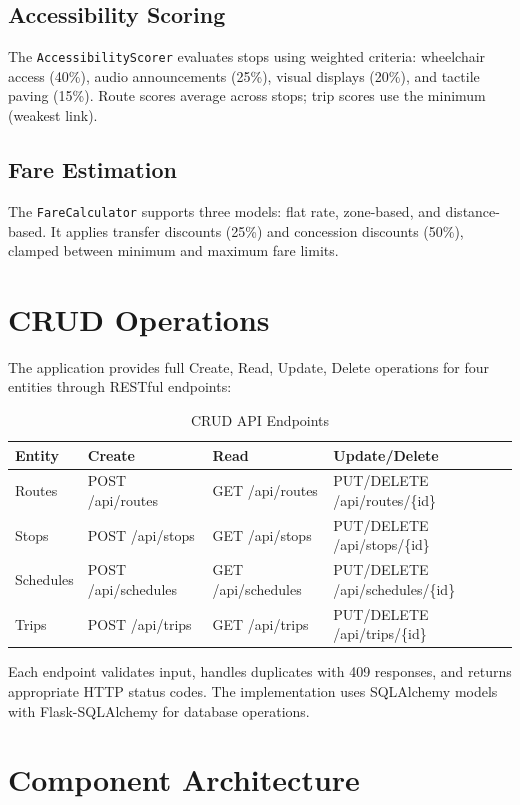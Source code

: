 \documentclass[conference]{IEEEtran}
\begin{document}
\subsection{Accessibility Scoring}

The \texttt{AccessibilityScorer} evaluates stops using weighted criteria: wheelchair access (40\%), audio announcements (25\%), visual displays (20\%), and tactile paving (15\%). Route scores average across stops; trip scores use the minimum (weakest link).

\subsection{Fare Estimation}

The \texttt{FareCalculator} supports three models: flat rate, zone-based, and distance-based. It applies transfer discounts (25\%) and concession discounts (50\%), clamped between minimum and maximum fare limits.

\section{CRUD Operations}

The application provides full Create, Read, Update, Delete operations for four entities through RESTful endpoints:

\begin{table}[H]
\centering
\caption{CRUD API Endpoints}
\begin{tabular}{@{}llll@{}}
\toprule
Entity & Create & Read & Update/Delete \\
\midrule
Routes & POST /api/routes & GET /api/routes & PUT/DELETE /api/routes/\{id\} \\
Stops & POST /api/stops & GET /api/stops & PUT/DELETE /api/stops/\{id\} \\
Schedules & POST /api/schedules & GET /api/schedules & PUT/DELETE /api/schedules/\{id\} \\
Trips & POST /api/trips & GET /api/trips & PUT/DELETE /api/trips/\{id\} \\
\bottomrule
\end{tabular}
\end{table}

Each endpoint validates input, handles duplicates with 409 responses, and returns appropriate HTTP status codes. The implementation uses SQLAlchemy models with Flask-SQLAlchemy for database operations.

\section{Component Architecture}
\end{document}

